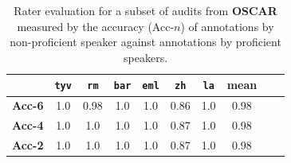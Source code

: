\begin{table}[!htbp]
    \centering
    \caption{Rater evaluation for a subset of audits from \textbf{CCAligned} (translated from English) measured by the accuracy (Acc-$n$) of annotations by non-proficient speaker against annotations by proficient speakers.
    }
    \label{tab:agreement_ccaligned}
\end{table}

\begin{table}[!htbp]
    \centering\small

        \begin{tabular}{lccccccccc}
            \toprule
                           & \texttt{tyv} & \texttt{rm} & \texttt{bar} & \texttt{eml} & \texttt{zh} & \texttt{la} & \textbf{mean} \\
            \midrule
            \textbf{Acc-6} & 1.0          & 0.98        & 1.0          & 1.0          & 0.86        & 1.0         & 0.98          \\
            \textbf{Acc-4} & 1.0          & 1.0         & 1.0          & 1.0          & 0.87        & 1.0         & 0.98          \\
            \textbf{Acc-2} & 1.0          & 1.0         & 1.0          & 1.0          & 0.87        & 1.0         & 0.98          \\
            \bottomrule
        \end{tabular}%
    \caption{Rater evaluation for a subset of audits from \textbf{OSCAR} measured by the accuracy (Acc-$n$) of annotations by non-proficient speaker against annotations by proficient speakers.}
    \label{tab:agreement_oscar}
\end{table}

